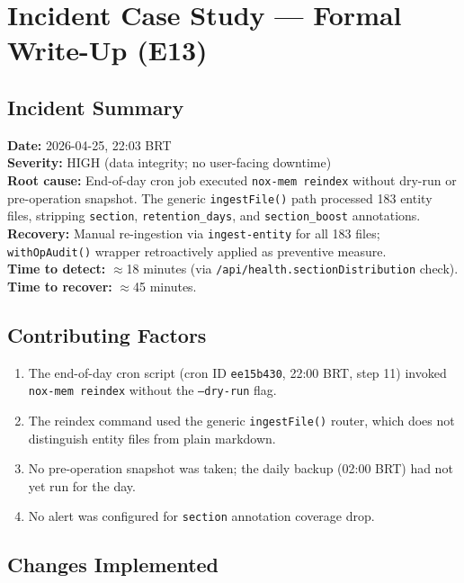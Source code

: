 \section{Incident Case Study --- Formal Write-Up (E13)}

\subsection{Incident Summary}

\textbf{Date:} 2026-04-25, 22:03 BRT \\
\textbf{Severity:} HIGH (data integrity; no user-facing downtime) \\
\textbf{Root cause:} End-of-day cron job executed \texttt{nox-mem reindex} without
dry-run or pre-operation snapshot. The generic \texttt{ingestFile()} path processed 183
entity files, stripping \texttt{section}, \texttt{retention\_days}, and
\texttt{section\_boost} annotations. \\
\textbf{Recovery:} Manual re-ingestion via \texttt{ingest-entity} for all 183 files;
\texttt{withOpAudit()} wrapper retroactively applied as preventive measure. \\
\textbf{Time to detect:} $\approx$18 minutes (via
\texttt{/api/health.sectionDistribution} check). \\
\textbf{Time to recover:} $\approx$45 minutes.

\subsection{Contributing Factors}

\begin{enumerate}
  \item The end-of-day cron script (cron ID \texttt{ee15b430}, 22:00 BRT, step 11)
    invoked \texttt{nox-mem reindex} without the \texttt{--dry-run} flag.
  \item The reindex command used the generic \texttt{ingestFile()} router, which does not
    distinguish entity files from plain markdown.
  \item No pre-operation snapshot was taken; the daily backup (02:00 BRT) had not yet run
    for the day.
  \item No alert was configured for \texttt{section} annotation coverage drop.
\end{enumerate}

\subsection{Changes Implemented}


